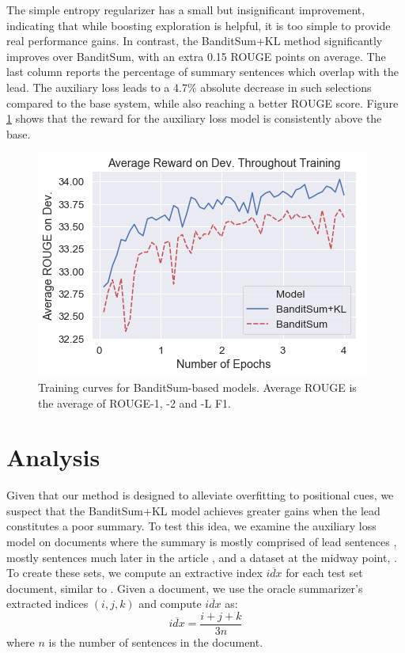 The simple entropy regularizer has a small but insignificant improvement, indicating that while boosting exploration is helpful, it is too simple to provide real performance gains. In contrast, the BanditSum+KL method significantly improves over BanditSum, with an extra 0.15 ROUGE points on average. The last column reports the percentage of summary sentences which overlap with the lead. The auxiliary loss leads to a 4.7\% absolute decrease in such selections compared to the base system, while also reaching a better ROUGE score. Figure \ref{fig:train_curves} shows that the reward for the auxiliary loss model is consistently above the base.

\begin{figure}
    \centering
    \includegraphics[width=0.75\linewidth]{fig/final_dev_fig.png}
    \caption[Training curves for BanditSum-based models.]{Training curves for BanditSum-based models. Average ROUGE is the average of ROUGE-1, -2 and -L F1.}
    \label{fig:train_curves}
\end{figure}

\section{Analysis}
Given that our method is designed to alleviate overfitting to positional cues, we suspect that the BanditSum+KL model achieves greater gains when the lead constitutes a poor summary. To test this idea, we examine the auxiliary loss model on documents where the summary is mostly comprised of lead sentences \Dearly{}, mostly sentences much later in the article \Dlate{}, and a dataset at the midway point, \Dmedian{}. To create these sets, we compute an extractive index $\overline{idx}$ for each test set document, similar to \cite{dong2018banditsum}. Given a document, we use the oracle summarizer's extracted indices $(i, j, k)$ and compute $\overline{idx}$ as:
\begin{equation}
    \overline{idx} = \frac{i + j + k}{3n}
\end{equation}
where $n$ is the number of sentences in the document.

